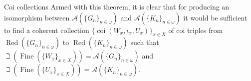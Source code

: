 \documentclass{amsart}
\theoremstyle{definition}\newtheorem{theorem}{Theorem}
\theoremstyle{definition}\newtheorem*{A}{Main Theorem}
\theoremstyle{definition}\newtheorem*{B}{Theorem \ref{elementaryequiv}}
\theoremstyle{definition}\newtheorem*{C}{Theorem \ref{continuous}}
\theoremstyle{definition}\newtheorem*{D}{Theorem \ref{bigisomorphism2}}
\theoremstyle{definition}\newtheorem{bigtheorem}{Main Theorem}
\numberwithin{theorem}{section}
\theoremstyle{definition}\newtheorem{corollary}[theorem]{Corollary}
\theoremstyle{definition}\newtheorem{proposition}[theorem]{Proposition}
\theoremstyle{definition}\newtheorem{definition}[theorem]{Definition}
\theoremstyle{definition}\newtheorem{question}[theorem]{Question}
\theoremstyle{definition}\newtheorem{example}[theorem]{Example}
\theoremstyle{definition}\newtheorem{remark}[theorem]{Remark}
\theoremstyle{definition}\newtheorem{note}[theorem]{Note}
\theoremstyle{definition}\newtheorem{lemma}[theorem]{Lemma}
\theoremstyle{definition}\newtheorem{fact}[theorem]{Fact}
\theoremstyle{definition}\newtheorem{define}[theorem]{Definition}
\theoremstyle{definition}\newtheorem{claim}[theorem]{Claim}
\theoremstyle{definition}\newtheorem{obs}[theorem]{Observation}
\theoremstyle{definition}\newtheorem{definitions}[theorem]{Definitions}
\newcommand{\Red}{\operatorname{Red}}
\newcommand{\Fine}{\operatorname{Fine}}
\newcommand{\coi}{\operatorname{coi}}
\begin{document}
\begin{section}{Coi collections}
Armed with this theorem, it is clear that for producing an isomorphism between $\mathcal{A}(\{G_n\}_{n \in \omega})$ and $\mathcal{A}(\{K_n\}_{n \in \omega})$ it would be sufficient to find a coherent collection $\{\coi(W_x, \iota_x, U_x)\}_{x \in X}$ of coi triples from $\Red(\{G_n\}_{n \in \omega})$ to $\Red(\{K_n\}_{n \in \omega})$ such that $\beth(\Fine(\{W_x\}_{x \in X})) = \mathcal{A}(\{G_n\}_{n \in \omega})$ and $\beth(\Fine(\{U_x\}_{x \in X})) = \mathcal{A}(\{K_n\}_{n \in \omega})$.
\end{section}
\end{document}
